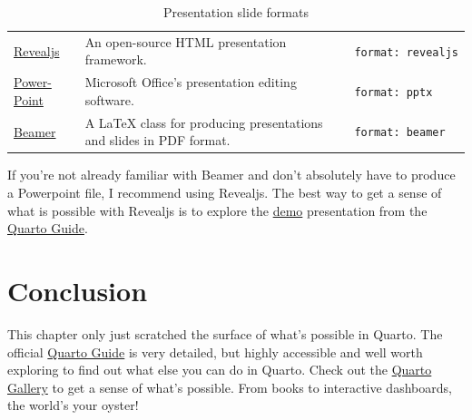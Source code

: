 \documentclass[
  letterpaper,
  DIV=11,
  numbers=noendperiod]{scrreprt}
\begin{document}
\begin{longtable}[]{@{}
  >{\raggedright\arraybackslash}p{}
  >{\raggedright\arraybackslash}p{}
  >{\raggedright\arraybackslash}p{}@{}}
\caption{Presentation slide formats}\label{tbl-Slides}\tabularnewline
\toprule\noalign{}
\endfirsthead
\endhead
\bottomrule\noalign{}
\endlastfoot
\href{https://quarto.org/docs/presentations/revealjs/}{Revealjs} & An
open-source HTML presentation framework. & \texttt{format:\ revealjs} \\
\href{https://quarto.org/docs/presentations/powerpoint.html}{Power-Point}
& Microsoft Office's presentation editing software. &
\texttt{format:\ pptx} \\
\href{https://quarto.org/docs/presentations/beamer.html}{Beamer} & A
LaTeX class for producing presentations and slides in PDF format. &
\texttt{format:\ beamer} \\
\end{longtable}

If you're not already familiar with Beamer and don't absolutely have to
produce a Powerpoint file, I recommend using Revealjs. The best way to
get a sense of what is possible with Revealjs is to explore the
\href{https://quarto.org/docs/presentations/revealjs/demo/}{demo}
presentation from the
\href{https://quarto.org/docs/presentations/revealjs/}{Quarto Guide}.

\section{Conclusion}\label{conclusion-1}

This chapter only just scratched the surface of what's possible in
Quarto. The official \href{https://quarto.org/docs/guide/}{Quarto Guide}
is very detailed, but highly accessible and well worth exploring to find
out what else you can do in Quarto. Check out the
\href{https://quarto.org/docs/gallery/}{Quarto Gallery} to get a sense
of what's possible. From books to interactive dashboards, the world's
your oyster!~
\end{document}
